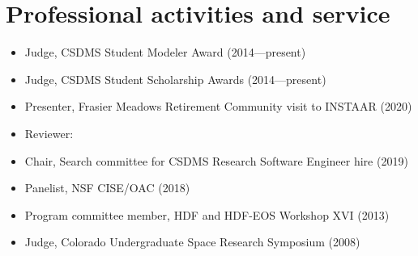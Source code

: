 \section{Professional activities and service}
\vspace{0.5em}

\begin{itemize}

  \item Judge, CSDMS Student Modeler Award (2014---present)

  \item Judge, CSDMS Student Scholarship Awards (2014---present)

  \item Presenter, Frasier Meadows Retirement Community visit to
    INSTAAR (2020)

  \item Reviewer:

  \item Chair, Search committee for CSDMS Research Software Engineer
    hire (2019)

  \item Panelist, NSF CISE/OAC (2018)

  \item Program committee member, HDF and HDF-EOS Workshop XVI (2013)

  \item Judge, Colorado Undergraduate Space Research Symposium (2008)

\end{itemize}
